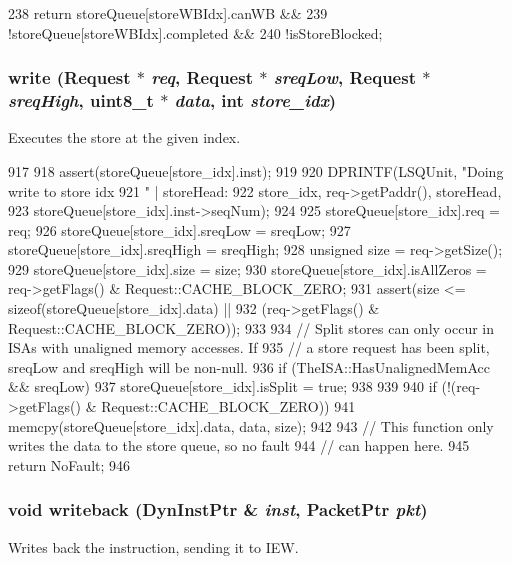 \begin{DoxyCode}
238                   { return storeQueue[storeWBIdx].canWB &&
239                         !storeQueue[storeWBIdx].completed &&
240                         !isStoreBlocked; }
\end{DoxyCode}
\hypertarget{classLSQUnit_a8910d991217dd388c788727f8ebbb267}{
\subsubsection[{write}]{ write ({\bf Request} $\ast$ {\em req}, \/  {\bf Request} $\ast$ {\em sreqLow}, \/  {\bf Request} $\ast$ {\em sreqHigh}, \/  uint8\_\-t $\ast$ {\em data}, \/  int {\em store\_\-idx})}}
\label{classLSQUnit_a8910d991217dd388c788727f8ebbb267}
Executes the store at the given index. 


\begin{DoxyCode}
917 {
918     assert(storeQueue[store_idx].inst);
919 
920     DPRINTF(LSQUnit, "Doing write to store idx %
921             " | storeHead:%
922             store_idx, req->getPaddr(), storeHead,
923             storeQueue[store_idx].inst->seqNum);
924 
925     storeQueue[store_idx].req = req;
926     storeQueue[store_idx].sreqLow = sreqLow;
927     storeQueue[store_idx].sreqHigh = sreqHigh;
928     unsigned size = req->getSize();
929     storeQueue[store_idx].size = size;
930     storeQueue[store_idx].isAllZeros = req->getFlags() & 
      Request::CACHE_BLOCK_ZERO;
931     assert(size <= sizeof(storeQueue[store_idx].data) ||
932             (req->getFlags() & Request::CACHE_BLOCK_ZERO));
933 
934     // Split stores can only occur in ISAs with unaligned memory accesses.  If
935     // a store request has been split, sreqLow and sreqHigh will be non-null.
936     if (TheISA::HasUnalignedMemAcc && sreqLow) {
937         storeQueue[store_idx].isSplit = true;
938     }
939 
940     if (!(req->getFlags() & Request::CACHE_BLOCK_ZERO))
941         memcpy(storeQueue[store_idx].data, data, size);
942 
943     // This function only writes the data to the store queue, so no fault
944     // can happen here.
945     return NoFault;
946 }
\end{DoxyCode}
\hypertarget{classLSQUnit_a3911bacb8817c31cfbeefd125dba0217}{
\subsubsection[{writeback}]{\setlength{\rightskip}{0pt plus 5cm}void writeback ({\bf DynInstPtr} \& {\em inst}, \/  {\bf PacketPtr} {\em pkt})}}
\label{classLSQUnit_a3911bacb8817c31cfbeefd125dba0217}
Writes back the instruction, sending it to IEW. 


